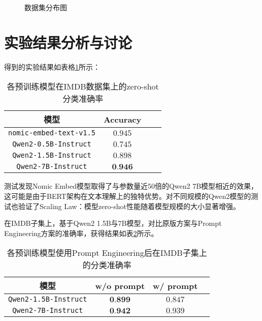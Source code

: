 \documentclass{article}
\begin{document}
\begin{figure}[htbp]
  \centering
  \caption{数据集分布图}
  \label{fig:data_distributed}
\end{figure}

\section{实验结果分析与讨论}

得到的实验结果如表格\ref{tab:pretrained_results}所示：
\begin{table}[htbp]
  \caption{\small{各预训练模型在IMDB数据集上的zero-shot分类准确率}}
  \label{tab:pretrained_results}
  \centering
  \begin{tabular}{cccc}
    \toprule
    模型                   & Accuracy         \\
    \midrule
    \verb|nomic-embed-text-v1.5| & $0.945$          \\
    \midrule
    \verb|Qwen2-0.5B-Instruct| & $0.745$          \\
    \midrule
    \verb|Qwen2-1.5B-Instruct| & $0.898$          \\
    \midrule
    \verb|Qwen2-7B-Instruct| & $\textbf{0.946}$ \\
    \bottomrule
  \end{tabular}
\end{table}

测试发现Nomic Embed模型取得了与参数量近50倍的Qwen2 7B模型相近的效果，这可能是由于BERT架构在文本理解上的独特优势。对不同规模的Qwen2模型的测试也验证了Scaling Law\cite{scaling}：模型zero-shot性能随着模型规模的大小显著增强。

在IMDB子集上，基于Qwen2 1.5B与7B模型，对比原版方案与Prompt Engineering方案的准确率，获得结果如表\ref{tab:prompt_results}所示。

\begin{table}[htbp]
  \caption{\small{各预训练模型使用Prompt Engineering后在IMDB子集上的分类准确率}}
  \label{tab:prompt_results}
  \centering
  \begin{tabular}{cccc}
    \toprule
    模型                   & w/o prompt       & w/ prompt \\
    \midrule
    \verb|Qwen2-1.5B-Instruct| & $\textbf{0.899}$ & $0.847$   \\
    \midrule
    \verb|Qwen2-7B-Instruct| & $\textbf{0.942}$ & $0.939$   \\
    \bottomrule
  \end{tabular}
\end{table}
\end{document}
